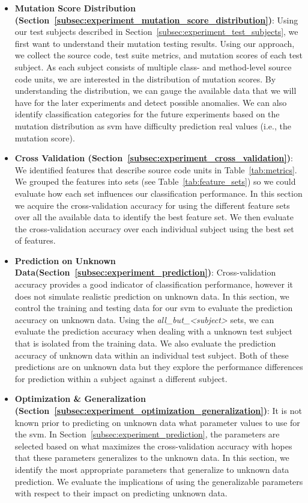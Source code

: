 \begin{itemize}
  \item \textbf{Mutation Score Distribution (Section~\ref{subsec:experiment_mutation_score_distribution})}: Using our test subjects described in Section~\ref{subsec:experiment_test_subjects}, we first want to understand their mutation testing results. Using our approach, we collect the source code, test suite metrics, and mutation scores of each test subject. As each subject consists of multiple class- and method-level source code units, we are interested in the distribution of mutation scores. By understanding the distribution, we can gauge the available data that we will have for the later experiments and detect possible anomalies. We can also identify classification categories for the future experiments based on the mutation distribution as \gls{svm} have difficulty prediction real values (i.e., the mutation score).
  \item \textbf{Cross Validation (Section~\ref{subsec:experiment_cross_validation})}: We identified features that describe source code units in Table~\ref{tab:metrics}. We grouped the features into sets (see Table~\ref{tab:feature_sets}) so we could evaluate how each set influences our classification performance. In this section we acquire the cross-validation accuracy for using the different feature sets over all the available data to identify the best feature set. We then evaluate the cross-validation accuracy over each individual subject using the best set of features.
  \item \textbf{Prediction on Unknown Data(Section~\ref{subsec:experiment_prediction})}: Cross-validation accuracy provides a good indicator of classification performance, however it does not simulate realistic prediction on unknown data. In this section, we  control the training and testing data for our \gls{svm} to evaluate the prediction accuracy on unknown data. Using the \emph{all\_but\_<subject>} sets, we can evaluate the prediction accuracy when dealing with a unknown test subject that is isolated from the training data. We also evaluate the prediction accuracy of unknown data within an individual test subject. Both of these predictions are on unknown data but they explore the performance differences for prediction within a subject against a different subject.
  \item \textbf{Optimization \& Generalization (Section~\ref{subsec:experiment_optimization_generalization})}: It is not known prior to predicting on unknown data what parameter values to use for the \gls{svm}. In Section~\ref{subsec:experiment_prediction}, the parameters are selected based on what maximizes the cross-validation accuracy with hopes that these parameters generalizes to the unknown data. In this section, we identify the most appropriate parameters that generalize to unknown data prediction. We evaluate the implications of using the generalizable parameters with respect to their impact on predicting unknown data.

\end{itemize}
